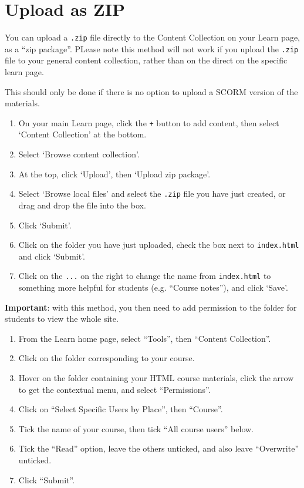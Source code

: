 \section{Upload as ZIP}
\label{appb:zip}

You can upload a \verb|.zip| file directly to the Content Collection on your Learn page, as a ``zip package''. PLease note this method will not work if you upload the \verb|.zip| file to your general content collection, rather than on the direct on the specific learn page.

This should only be done if there is no option to upload a SCORM version of the materials.

\begin{enumerate}
    \item On your main Learn page, click the \verb|+| button to add content, then select `Content Collection' at the bottom.
    \item Select `Browse content collection'.
    \item At the top, click `Upload', then `Upload zip package'.
    \item Select `Browse local files' and select the \verb|.zip| file you have just created, or drag and drop the file into the box.
    \item Click `Submit'.
    \item Click on the folder you have just uploaded, check the box next to \verb|index.html| and click `Submit'. 
    \item Click on the \verb|...| on the right to change the name from \verb|index.html| to something more helpful for students (e.g. ``Course notes''), and click `Save'.
\end{enumerate}

\textbf{Important}: with this method, you then need to add permission to the folder for students to view the whole site.

\begin{enumerate}
    \item From the Learn home page, select ``Tools'', then ``Content Collection''.
    \item Click on the folder corresponding to your course.
    \item Hover on the folder containing your HTML course materials, click the arrow to get the contextual menu, and select ``Permissions''.
    \item Click on ``Select Specific Users by Place'', then ``Course''.
    \item Tick the name of your course, then tick ``All course users'' below.
    \item Tick the ``Read'' option, leave the others unticked, and also leave ``Overwrite'' unticked.
    \item Click ``Submit''.
\end{enumerate}


